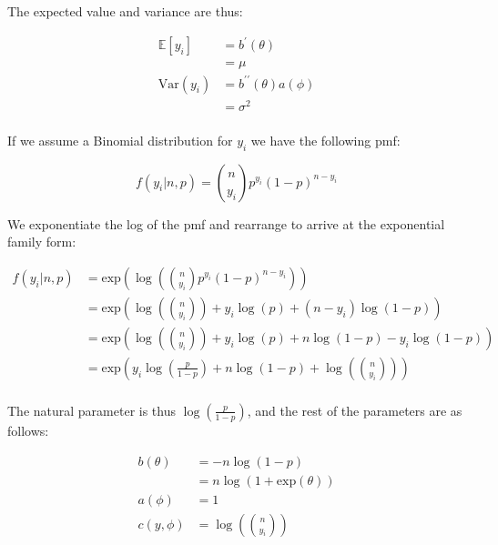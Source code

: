 \documentclass{report}
\begin{document}
The expected value and variance are thus:

\begin{equation}\label{eq:ex-glm-normal-dist-mean-var}
    \begin{aligned}
        \mathbb{E}[y_i]
          &= b^\prime(\theta) \\
          &= \mu \\
        \text{Var}(y_i)
          &= b^{\prime\prime}(\theta)a(\phi) \\
          &= \sigma^2 \\
    \end{aligned}
\end{equation}

If we assume a Binomial distribution for $y_i$ we have the following \gls{pmf}:

\begin{equation}\label{eq:ex-glm-binomial-dist}
    f(y_i|n, p) = \binom{n}{y_i}p^{y_i} (1-p)^{n-y_i}
\end{equation}

We exponentiate the log of the \gls{pmf} and rearrange to arrive at the exponential family form:

\begin{equation}\label{eq:ex-glm-binomial-dist-exp-form}
    \begin{aligned}
        f(y_i|n, p) 
          &= \text{exp}\left(\log\left(\binom{n}{y_i}p^{y_i} (1-p)^{n-y_i}\right)\right) \\
          &= \text{exp}\left(\log\left(\binom{n}{y_i}\right) + y_i\log(p) + (n-y_i)\log(1-p)\right) \\
          &= \text{exp}\left(\log\left(\binom{n}{y_i}\right) + y_i\log(p) + n\log(1-p) - y_i\log(1-p)\right) \\
          &= \text{exp}\left(y_i\log\left(\frac{p}{1-p}\right) + n\log(1-p) + \log\left(\binom{n}{y_i}\right)\right) \\
    \end{aligned}
\end{equation}

The natural parameter is thus $\log\left(\frac{p}{1-p}\right)$, and the rest of the parameters are as follows:

\begin{equation}\label{eq:ex-glm-binomial-dist-params}
    \begin{aligned}
        b(\theta)
          &= -n \log(1 - p) \\
          &= n \log(1 + \text{exp}(\theta)) \\
        a(\phi) &= 1 \\
        c(y, \phi) &= \log\left(\binom{n}{y_i}\right) \\
    \end{aligned}
\end{equation}
\end{document}
